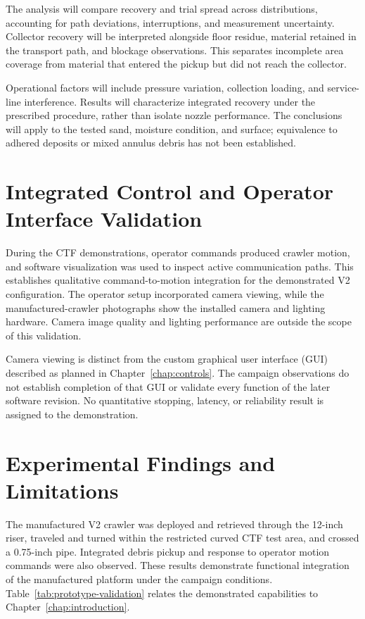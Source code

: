 The analysis will compare recovery and trial spread across distributions, accounting for path deviations, interruptions, and measurement uncertainty. Collector recovery will be interpreted alongside floor residue, material retained in the transport path, and blockage observations. This separates incomplete area coverage from material that entered the pickup but did not reach the collector.

Operational factors will include pressure variation, collection loading, and service-line interference. Results will characterize integrated recovery under the prescribed procedure, rather than isolate nozzle performance. The conclusions will apply to the tested sand, moisture condition, and surface; equivalence to adhered deposits or mixed annulus debris has not been established.

\section{Integrated Control and Operator Interface Validation}
\label{sec:control-tests}
During the CTF demonstrations, operator commands produced crawler motion, and software visualization was used to inspect active communication paths. This establishes qualitative command-to-motion integration for the demonstrated V2 configuration. The operator setup incorporated camera viewing, while the manufactured-crawler photographs show the installed camera and lighting hardware. Camera image quality and lighting performance are outside the scope of this validation.

Camera viewing is distinct from the custom graphical user interface (GUI) described as planned in Chapter~\ref{chap:controls}. The campaign observations do not establish completion of that GUI or validate every function of the later software revision. No quantitative stopping, latency, or reliability result is assigned to the demonstration.

\section{Experimental Findings and Limitations}
\label{sec:validation-findings}
The manufactured V2 crawler was deployed and retrieved through the 12-inch riser, traveled and turned within the restricted curved CTF test area, and crossed a 0.75-inch pipe. Integrated debris pickup and response to operator motion commands were also observed. These results demonstrate functional integration of the manufactured platform under the campaign conditions. Table~\ref{tab:prototype-validation} relates the demonstrated capabilities to Chapter~\ref{chap:introduction}.

